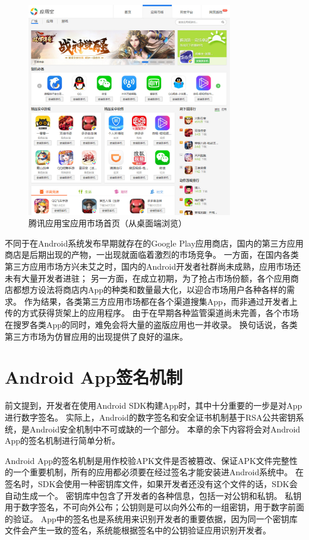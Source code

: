 \begin{figure}[htbp]
	\centering
	\includegraphics[width=0.8\textwidth]{./Figures/edwin-yyb.jpg}
	\caption{腾讯应用宝应用市场首页（从桌面端浏览）}
	\label{fig:mkt-yyb}
	\vspace{-5mm}
\end{figure}

不同于在Android系统发布早期就存在的Google Play应用商店，国内的第三方应用商店是后期出现的产物，一出现就面临着激烈的市场竞争。
一方面，在国内各类第三方应用市场方兴未艾之时，国内的Android开发者社群尚未成熟，应用市场还未有大量开发者进驻；
另一方面，在成立初期，为了抢占市场份额，各个应用商店都想方设法将商店内App的种类和数量最大化，以迎合市场用户各种各样的需求。
作为结果，各类第三方应用市场都在各个渠道搜集App，而非通过开发者上传的方式获得货架上的应用程序。
由于在早期各种监管渠道尚未完善，各个市场在搜罗各类App的同时，难免会将大量的盗版应用也一并收录。
换句话说，各类第三方市场为仿冒应用的出现提供了良好的温床。

\section{Android App签名机制}
\label{sec:signature}

前文提到，开发者在使用Android SDK构建App时，其中十分重要的一步是对App进行数字签名。
实际上，Android的数字签名和安全证书机制基于RSA公共密钥系统，是Android安全机制中不可或缺的一个部分。
本章的余下内容将会对Android App的签名机制进行简单分析。

Android App的签名机制是用作校验APK文件是否被篡改、保证APK文件完整性的一个重要机制，所有的应用都必须要在经过签名才能安装进Android系统中。
在签名时，SDK会使用一种密钥库文件，如果开发者还没有这个文件的话，SDK会自动生成一个。
密钥库中包含了开发者的各种信息，包括一对公钥和私钥。
私钥用于数字签名，不可向外公布；公钥则是可以向外公布的一组密钥，用于数字前面的验证。
App中的签名也是系统用来识别开发者的重要依据，因为同一个密钥库文件会产生一致的签名，系统能根据签名中的公钥验证应用识别开发者。

